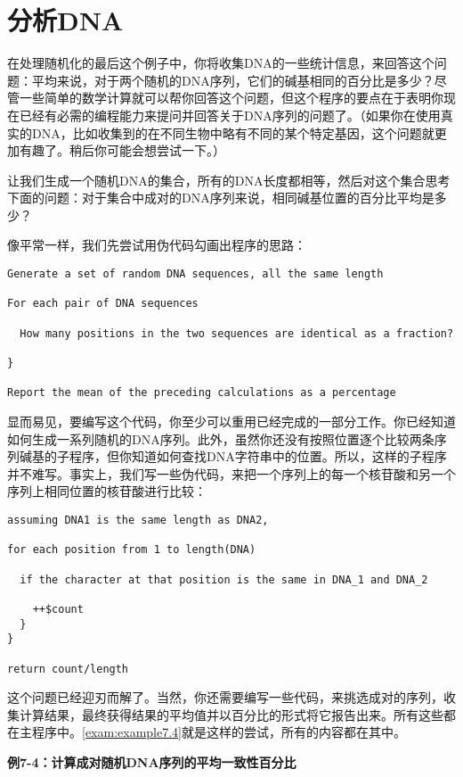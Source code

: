 \section{分析DNA}
在处理随机化的最后这个例子中，你将收集DNA的一些统计信息，来回答这个问题：平均来说，对于两个随机的DNA序列，它们的碱基相同的百分比是多少？尽管一些简单的数学计算就可以帮你回答这个问题，但这个程序的要点在于表明你现在已经有必需的编程能力来提问并回答关于DNA序列的问题了。（如果你在使用真实的DNA，比如收集到的在不同生物中略有不同的某个特定基因，这个问题就更加有趣了。稍后你可能会想尝试一下。）

让我们生成一个随机DNA的集合，所有的DNA长度都相等，然后对这个集合思考下面的问题：对于集合中成对的DNA序列来说，相同碱基位置的百分比平均是多少？

像平常一样，我们先尝试用伪代码勾画出程序的思路：

\begin{lstlisting}
Generate a set of random DNA sequences, all the same length

For each pair of DNA sequences

  How many positions in the two sequences are identical as a fraction?

}

Report the mean of the preceding calculations as a percentage
\end{lstlisting}

显而易见，要编写这个代码，你至少可以重用已经完成的一部分工作。你已经知道如何生成一系列随机的DNA序列。此外，虽然你还没有按照位置逐个比较两条序列碱基的子程序，但你知道如何查找DNA字符串中的位置。所以，这样的子程序并不难写。事实上，我们写一些伪代码，来把一个序列上的每一个核苷酸和另一个序列上相同位置的核苷酸进行比较：

\begin{lstlisting}
assuming DNA1 is the same length as DNA2,

for each position from 1 to length(DNA)

  if the character at that position is the same in DNA_1 and DNA_2

    ++$count
  }
}

return count/length
\end{lstlisting}

这个问题已经迎刃而解了。当然，你还需要编写一些代码，来挑选成对的序列，收集计算结果，最终获得结果的平均值并以百分比的形式将它报告出来。所有这些都在主程序中。\autoref{exam:example7.4}就是这样的尝试，所有的内容都在其中。

\textbf{例7-4：计算成对随机DNA序列的平均一致性百分比}


